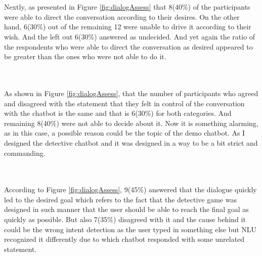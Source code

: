 \\~\\
Nextly, as presented in Figure \ref{fig:dialogAssess} that 8(40\%) of the participants were able to direct the conversation according to their desires. On the other hand, 6(30\%) out of the remaining 12 were unable to drive it according to their wish. And the left out 6(30\%) answered as undecided. And yet again the ratio of the respondents who were able to direct the conversation as desired appeared to be greater than the ones who were not able to do it.

\\~\\
As shown in Figure \ref{fig:dialogAssess}, that the number of participants who agreed and disagreed with the statement that they felt in control of the conversation with the chatbot is the same and that is 6(30\%) for both categories. And remaining 8(40\%) were not able to decide about it. Now it is something alarming, as in this case, a possible reason could be the topic of the demo chatbot. As I designed the detective chatbot and it was designed in a way to be a bit strict and commanding. 

\\~\\
According to Figure \ref{fig:dialogAssess}, 9(45\%) answered that the dialogue quickly led to the desired goal which refers to the fact that the detective game was designed in such manner that the user should be able to reach the final goal as quickly as possible. But also 7(35\%) disagreed with it and the cause behind it could be the wrong intent detection as the user typed in something else but NLU recognized it differently due to which chatbot responded with some unrelated statement.

